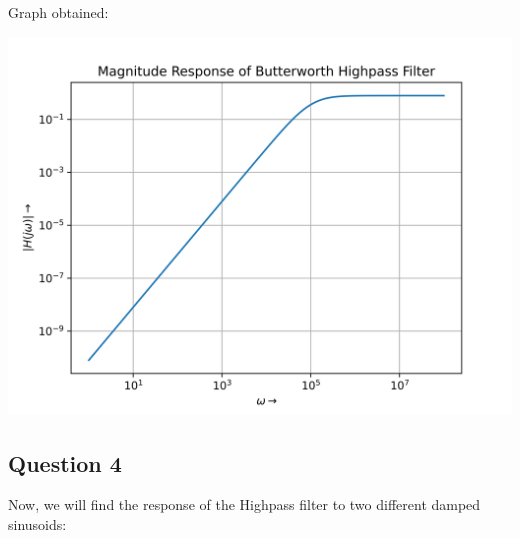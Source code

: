 \documentclass[12pt]{article}
\begin{document}
Graph obtained:
\begin{center}
    \includegraphics[scale=0.8]{images/fig3.png}
\end{center}

\pagebreak
\subsection{Question 4}

Now, we will find the response of the Highpass filter to two different damped sinusoids:
\end{document}
